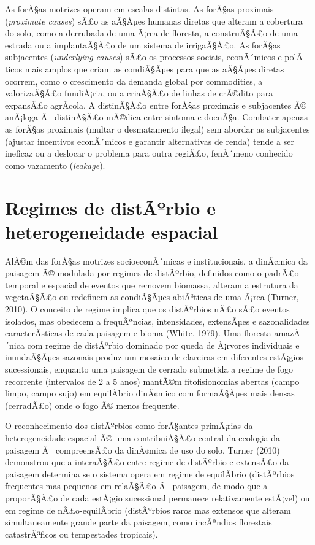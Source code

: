 \documentclass[
  portuguese,
  11pt,
  a4paper,
  open=any]{scrbook}
\begin{document}
As forÃ§as motrizes operam em escalas distintas. As forÃ§as proximais
(\emph{proximate causes}) sÃ£o as aÃ§Ãµes humanas diretas que alteram a
cobertura do solo, como a derrubada de uma Ã¡rea de floresta, a
construÃ§Ã£o de uma estrada ou a implantaÃ§Ã£o de um sistema de
irrigaÃ§Ã£o. As forÃ§as subjacentes (\emph{underlying causes}) sÃ£o os
processos sociais, econÃ´micos e polÃ­ticos mais amplos que criam as
condiÃ§Ãµes para que as aÃ§Ãµes diretas ocorrem, como o crescimento da
demanda global por commodities, a valorizaÃ§Ã£o fundiÃ¡ria, ou a
criaÃ§Ã£o de linhas de crÃ©dito para expansÃ£o agrÃ­cola. A distinÃ§Ã£o
entre forÃ§as proximais e subjacentes Ã© anÃ¡loga Ã~ distinÃ§Ã£o mÃ©dica
entre sintoma e doenÃ§a. Combater apenas as forÃ§as proximais (multar o
desmatamento ilegal) sem abordar as subjacentes (ajustar incentivos
econÃ´micos e garantir alternativas de renda) tende a ser ineficaz ou a
deslocar o problema para outra regiÃ£o, fenÃ´meno conhecido como
vazamento (\emph{leakage}).

\section{Regimes de distÃºrbio e heterogeneidade
espacial}\label{regimes-de-distuxe3uxbarbio-e-heterogeneidade-espacial}

AlÃ©m das forÃ§as motrizes socioeconÃ´micas e institucionais, a
dinÃ¢mica da paisagem Ã© modulada por regimes de distÃºrbio, definidos
como o padrÃ£o temporal e espacial de eventos que removem biomassa,
alteram a estrutura da vegetaÃ§Ã£o ou redefinem as condiÃ§Ãµes
abiÃ³ticas de uma Ã¡rea (Turner, 2010). O conceito de regime implica que
os distÃºrbios nÃ£o sÃ£o eventos isolados, mas obedecem a frequÃªncias,
intensidades, extensÃµes e sazonalidades caracterÃ­sticas de cada
paisagem e bioma (White, 1979). Uma floresta amazÃ´nica com regime de
distÃºrbio dominado por queda de Ã¡rvores individuais e inundaÃ§Ãµes
sazonais produz um mosaico de clareiras em diferentes estÃ¡gios
sucessionais, enquanto uma paisagem de cerrado submetida a regime de
fogo recorrente (intervalos de 2 a 5 anos) mantÃ©m fitofisionomias
abertas (campo limpo, campo sujo) em equilÃ­brio dinÃ¢mico com
formaÃ§Ãµes mais densas (cerradÃ£o) onde o fogo Ã© menos frequente.

O reconhecimento dos distÃºrbios como forÃ§antes primÃ¡rias da
heterogeneidade espacial Ã© uma contribuiÃ§Ã£o central da ecologia da
paisagem Ã~ compreensÃ£o da dinÃ¢mica de uso do solo. Turner (2010)
demonstrou que a interaÃ§Ã£o entre regime de distÃºrbio e extensÃ£o da
paisagem determina se o sistema opera em regime de equilÃ­brio
(distÃºrbios frequentes mas pequenos em relaÃ§Ã£o Ã~ paisagem, de modo
que a proporÃ§Ã£o de cada estÃ¡gio sucessional permanece relativamente
estÃ¡vel) ou em regime de nÃ£o-equilÃ­brio (distÃºrbios raros mas
extensos que alteram simultaneamente grande parte da paisagem, como
incÃªndios florestais catastrÃ³ficos ou tempestades tropicais).
\end{document}
